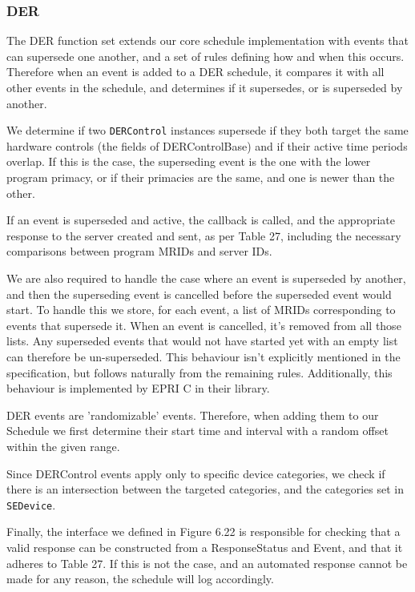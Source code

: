 \subsubsection{DER}
The DER function set extends our core schedule implementation with events that can supersede one another, and a set of rules defining how and when this occurs. Therefore when an event is added to a DER schedule, it compares it with all other events in the schedule, and determines if it supersedes, or is superseded by another. 

We determine if two \texttt{DERControl} instances supersede if they both target the same hardware controls (the fields of DERControlBase) and if their active time periods overlap. If this is the case, the superseding event is the one with the lower program primacy, or if their primacies are the same, and one is newer than the other.

If an event is superseded and active, the callback is called, and the appropriate response to the server created and sent, as per Table 27, including the necessary comparisons between program MRIDs and server IDs.

We are also required to handle the case where an event is superseded by another, and then the superseding event is cancelled before the superseded event would start. To handle this we store, for each event, a list of MRIDs corresponding to events that supersede it. When an event is cancelled, it's removed from all those lists. Any superseded events that would not have started yet with an empty list can therefore be un-superseded.
This behaviour isn't explicitly mentioned in the specification, but follows naturally from the remaining rules. Additionally, this behaviour is implemented by EPRI C in their library.

DER events are 'randomizable' events. Therefore, when adding them to our Schedule we first determine their start time and interval with a random offset within the given range.

Since DERControl events apply only to specific device categories, we check if there is an intersection between the targeted categories, and the categories set in \texttt{SEDevice}.

Finally, the interface we defined in Figure 6.22 is responsible for checking that a valid response can be constructed from a ResponseStatus and Event, and that it adheres to Table 27. If this is not the case, and an automated response cannot be made for any reason, the schedule will log accordingly.


